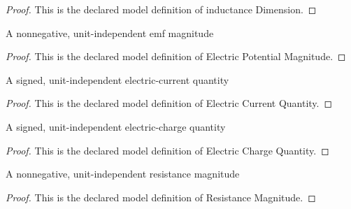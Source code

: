 \begin{proof}
  This is the declared model definition of inductance Dimension.
\end{proof}
\begin{definition}
  \label{def:physics:phyx-mini-0991:phyxminiproblems-problemphyxmini0991-electricpotentialmagnitude}
  A nonnegative, unit-independent emf magnitude
\end{definition}
\begin{proof}
  This is the declared model definition of Electric Potential Magnitude.
\end{proof}
\begin{definition}
  \label{def:physics:phyx-mini-0991:phyxminiproblems-problemphyxmini0991-electriccurrentquantity}
  A signed, unit-independent electric-current quantity
\end{definition}
\begin{proof}
  This is the declared model definition of Electric Current Quantity.
\end{proof}
\begin{definition}
  \label{def:physics:phyx-mini-0991:phyxminiproblems-problemphyxmini0991-electricchargequantity}
  A signed, unit-independent electric-charge quantity
\end{definition}
\begin{proof}
  This is the declared model definition of Electric Charge Quantity.
\end{proof}
\begin{definition}
  \label{def:physics:phyx-mini-0991:phyxminiproblems-problemphyxmini0991-resistancemagnitude}
  A nonnegative, unit-independent resistance magnitude
\end{definition}
\begin{proof}
  This is the declared model definition of Resistance Magnitude.
\end{proof}
